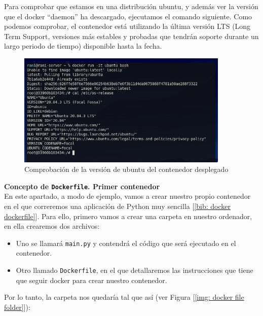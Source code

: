 \documentclass[12pt]{article}
\begin{document}
	\noindent Para comprobar que estamos en una distribución ubuntu, y además ver la versión que el docker ``daemon'' ha descargado, ejecutamos el comando siguiente. Como podemos comprobar, el contenedor está utilizando la última versión LTS (Long Term Support, versiones más estables y probadas que tendrán soporte durante un largo periodo de tiempo) disponible hasta la fecha.
	
	\begin{figure}[h]
		\begin{center}
			\includegraphics[width=0.9\textwidth]{img/docker_ubuntu_ver.png}
			\caption{Comprobación de la versión de ubuntu del contenedor desplegado}
			\label{img: docker ubuntu ver}
		\end{center}
	\end{figure}

	\pagebreak

	\noindent \textbf{\large Concepto de \texttt{Dockerfile}. Primer contenedor}\\
	
	\noindent En este apartado, a modo de ejemplo, vamos a crear nuestro propio contenedor en el que correremos una aplicación de Python muy sencilla [\ref{bib: docker dockerfile}]. Para ello, primero vamos a crear una carpeta en nuestro ordenador, en ella crearemos dos archivos:
	\begin{itemize}
		\item Uno se llamará \texttt{main.py} y contendrá el código que será ejecutado en el contenedor.
		\item Otro llamado \texttt{Dockerfile}, en el que detallaremos las instrucciones que tiene que seguir docker para crear nuestro contenedor.
	\end{itemize}

	\noindent Por lo tanto, la carpeta nos quedaría tal que así (ver Figura [\ref{img: docker file folder}]):
	
\end{document}
